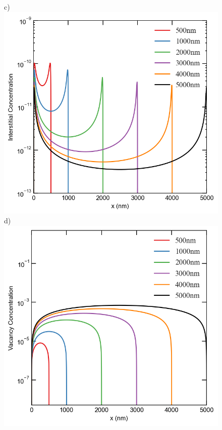 \documentclass[utf8]{frontiersSCNS} %
\begin{document}
\begin{figure}[h!]
        c)\includegraphics[scale=0.55]{interstitial_concentration_500-5000nm-high_neutron-5}
        d)\includegraphics[scale=0.55]{vacancy_concentration_500-5000nm-high_neutron-5}

\end{figure}
\end{document}
